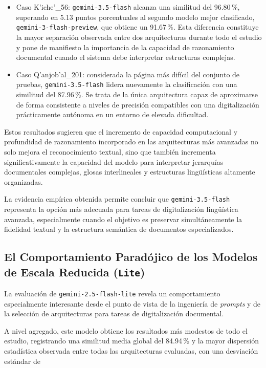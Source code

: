 \begin{itemize}
    \item Caso K'iche'\_56: \texttt{gemini-3.5-flash} alcanza una similitud del 96.80\,\%, superando en 5.13 puntos porcentuales al segundo modelo mejor clasificado, \texttt{gemini-3-flash-preview}, que obtiene un 91.67\,\%. Esta diferencia constituye la mayor separación observada entre dos arquitecturas durante todo el estudio y pone de manifiesto la importancia de la capacidad de razonamiento documental cuando el sistema debe interpretar estructuras complejas.

    \item Caso Q'anjob'al\_201: considerada la página más difícil del conjunto de pruebas, \texttt{gemini-3.5-flash} lidera nuevamente la clasificación con una similitud del 87.96\,\%. Se trata de la única arquitectura capaz de aproximarse de forma consistente a niveles de precisión compatibles con una digitalización prácticamente autónoma en un entorno de elevada dificultad.
\end{itemize}

Estos resultados sugieren que el incremento de capacidad computacional y profundidad de razonamiento incorporado en las arquitecturas más avanzadas no solo mejora el reconocimiento textual, sino que también incrementa significativamente la capacidad del modelo para interpretar jerarquías documentales complejas, glosas interlineales y estructuras lingüísticas altamente organizadas.

La evidencia empírica obtenida permite concluir que \texttt{gemini-3.5-flash} representa la opción más adecuada para tareas de digitalización lingüística avanzada, especialmente cuando el objetivo es preservar simultáneamente la fidelidad textual y la estructura semántica de documentos especializados.



\subsection{El Comportamiento Paradójico de los Modelos de Escala Reducida (\texttt{Lite})}

La evaluación de \texttt{gemini-2.5-flash-lite} revela un comportamiento especialmente interesante desde el punto de vista de la ingeniería de \textit{prompts} y de la selección de arquitecturas para tareas de digitalización documental.

A nivel agregado, este modelo obtiene los resultados más modestos de todo el estudio, registrando una similitud media global del 84.94\,\% y la mayor dispersión estadística observada entre todas las arquitecturas evaluadas, con una desviación estándar de

